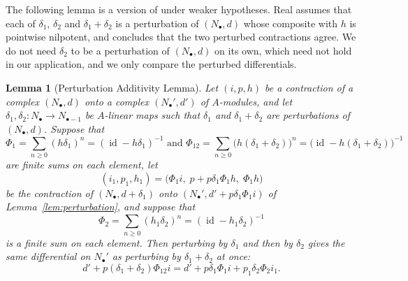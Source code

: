 \documentclass[12pt]{amsart}
\theoremstyle{plain}
\newtheorem{lemma}[theorem]{Lemma}
\theoremstyle{definition}
\newcommand{\id}{\operatorname{id}}
\begin{document}
The following lemma is a version of \cite[Proposition~3.6]{Real2000} under weaker hypotheses. Real assumes that each of $\delta_1$, $\delta_2$ and $\delta_1 + \delta_2$ is a perturbation of $(N_\bullet, d)$ whose composite with $h$ is pointwise nilpotent, and concludes that the two perturbed contractions agree. We do not need $\delta_2$ to be a perturbation of $(N_\bullet, d)$ on its own, which need not hold in our application, and we only compare the perturbed differentials.
\begin{lemma}[Perturbation Additivity Lemma]\label{lem:additive}
    Let $(i, p, h)$ be a contraction of a complex $(N_\bullet, d)$ onto a complex $(N_\bullet', d')$ of $A$-modules, and let $\delta_1, \delta_2 \colon N_\bullet \to N_{\bullet - 1}$ be $A$-linear maps such that $\delta_1$ and $\delta_1 + \delta_2$ are perturbations of $(N_\bullet, d)$. Suppose that $$\Phi_1 = \sum_{n \ge 0} (h\delta_1)^n = (\id - h\delta_1)^{-1} \text{ and } \Phi_{12} = \sum_{n \ge 0} \bigl( h(\delta_1 + \delta_2) \bigr)^n = \bigl(\id - h(\delta_1 + \delta_2)\bigr)^{-1}$$ are finite sums on each element,
    let
    \[
        (i_1, p_1, h_1) = \bigl( \Phi_1 i, \; p + p \delta_1 \Phi_1 h, \; \Phi_1 h \bigr)
    \]
    be the contraction of $(N_\bullet, d + \delta_1)$ onto $(N_\bullet', d' + p \delta_1 \Phi_1 i)$ of Lemma~\ref{lem:perturbation}, and suppose that $$\Phi_2 = \sum_{n \ge 0} (h_1\delta_2)^n = (\id - h_1\delta_2)^{-1}$$ is a finite sum on each element. Then perturbing by $\delta_1$ and then by $\delta_2$ gives the same differential on $N_\bullet'$ as perturbing by $\delta_1 + \delta_2$ at once:
    \[
        d' + p (\delta_1 + \delta_2) \Phi_{12} i
        = d' + p \delta_1 \Phi_1 i + p_1 \delta_2 \Phi_2 i_1 .
    \]
\end{lemma}
\end{document}
